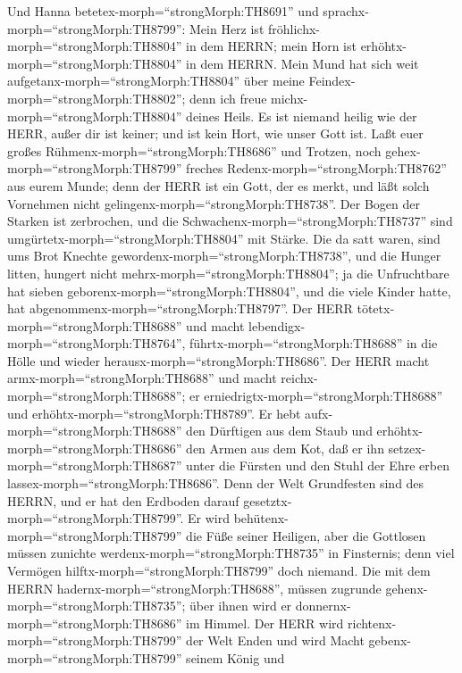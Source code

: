  Und Hanna betetex-morph=``strongMorph:TH8691'' und
sprachx-morph=``strongMorph:TH8799'': Mein Herz ist
fröhlichx-morph=``strongMorph:TH8804'' in dem HERRN; mein Horn ist
erhöhtx-morph=``strongMorph:TH8804'' in dem HERRN. Mein Mund hat sich
weit aufgetanx-morph=``strongMorph:TH8804'' über meine
Feindex-morph=``strongMorph:TH8802''; denn ich freue
michx-morph=``strongMorph:TH8804'' deines Heils.  Es ist
niemand heilig wie der HERR, außer dir ist keiner; und ist kein Hort,
wie unser Gott ist.  Laßt euer großes
Rühmenx-morph=``strongMorph:TH8686'' und Trotzen, noch
gehex-morph=``strongMorph:TH8799'' freches
Redenx-morph=``strongMorph:TH8762'' aus eurem Munde; denn der HERR ist
ein Gott, der es merkt, und läßt solch Vornehmen nicht
gelingenx-morph=``strongMorph:TH8738''.  Der Bogen der
Starken ist zerbrochen, und die Schwachenx-morph=``strongMorph:TH8737''
sind umgürtetx-morph=``strongMorph:TH8804'' mit Stärke.  Die
da satt waren, sind ums Brot Knechte
gewordenx-morph=``strongMorph:TH8738'', und die Hunger litten, hungert
nicht mehrx-morph=``strongMorph:TH8804''; ja die Unfruchtbare hat sieben
geborenx-morph=``strongMorph:TH8804'', und die viele Kinder hatte, hat
abgenommenx-morph=``strongMorph:TH8797''.  Der HERR
tötetx-morph=``strongMorph:TH8688'' und macht
lebendigx-morph=``strongMorph:TH8764'',
führtx-morph=``strongMorph:TH8688'' in die Hölle und wieder
herausx-morph=``strongMorph:TH8686''.  Der HERR macht
armx-morph=``strongMorph:TH8688'' und macht
reichx-morph=``strongMorph:TH8688''; er
erniedrigtx-morph=``strongMorph:TH8688'' und
erhöhtx-morph=``strongMorph:TH8789''.  Er hebt
aufx-morph=``strongMorph:TH8688'' den Dürftigen aus dem Staub und
erhöhtx-morph=``strongMorph:TH8686'' den Armen aus dem Kot, daß er ihn
setzex-morph=``strongMorph:TH8687'' unter die Fürsten und den Stuhl der
Ehre erben lassex-morph=``strongMorph:TH8686''. Denn der Welt
Grundfesten sind des HERRN, und er hat den Erdboden darauf
gesetztx-morph=``strongMorph:TH8799''.  Er wird
behütenx-morph=``strongMorph:TH8799'' die Füße seiner Heiligen, aber die
Gottlosen müssen zunichte werdenx-morph=``strongMorph:TH8735'' in
Finsternis; denn viel Vermögen hilftx-morph=``strongMorph:TH8799'' doch
niemand.  Die mit dem HERRN
hadernx-morph=``strongMorph:TH8688'', müssen zugrunde
gehenx-morph=``strongMorph:TH8735''; über ihnen wird er
donnernx-morph=``strongMorph:TH8686'' im Himmel. Der HERR wird
richtenx-morph=``strongMorph:TH8799'' der Welt Enden und wird Macht
gebenx-morph=``strongMorph:TH8799'' seinem König und
